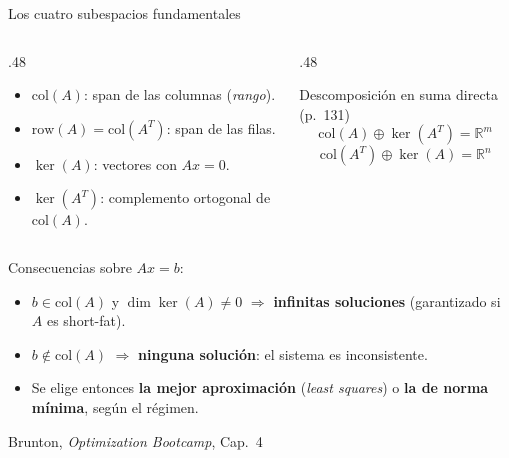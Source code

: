 \documentclass[10pt,aspectratio=169]{beamer}
\newcommand{\fuente}{\vfill{\scriptsize\color{gray}Brunton, \emph{Optimization Bootcamp}, Cap.~4}}
\newcommand{\R}{\mathbb{R}}
\newcommand{\col}{\mathrm{col}}
\begin{document}
\begin{frame}{Los cuatro subespacios fundamentales}
  \small
  \begin{columns}[T,onlytextwidth]
    \begin{column}{.48\textwidth}
      \begin{itemize}
        \item $\col(A)$: span de las columnas (\emph{rango}).
        \item $\mathrm{row}(A) = \col(A^T)$: span de las filas.
        \item $\ker(A)$: vectores con $Ax=0$.
        \item $\ker(A^T)$: complemento ortogonal de $\col(A)$.
      \end{itemize}
    \end{column}
    \begin{column}{.48\textwidth}
      \begin{block}{Descomposición en suma directa (p.~131)}
        \[
          \col(A) \oplus \ker(A^T) = \R^{m} \tag{4.9a}
        \]
        \[
          \col(A^T) \oplus \ker(A) = \R^{n} \tag{4.9b}
        \]
      \end{block}
    \end{column}
  \end{columns}

  \vspace{2mm}
  Consecuencias sobre $Ax=b$:
  \begin{itemize}
    \item $b \in \col(A)$ y $\dim\ker(A) \ne 0$ $\Rightarrow$ \textbf{infinitas
      soluciones} (garantizado si $A$ es short-fat).
    \item $b \notin \col(A)$ $\Rightarrow$ \textbf{ninguna solución}: el sistema
      es inconsistente.
    \item Se elige entonces \textbf{la mejor aproximación} (\emph{least squares})
      o \textbf{la de norma mínima}, según el régimen.
  \end{itemize}
  \fuente
\end{frame}
\end{document}
